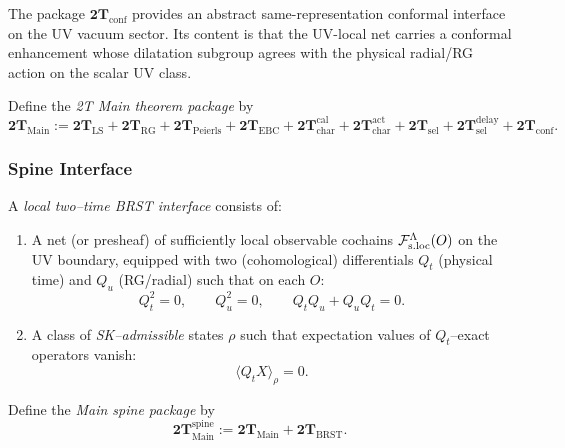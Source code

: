 \begin{remark}
\label{rem:2T-conf-source-role}
The package \(\mathbf{2T}_{\mathrm{conf}}\) provides an abstract
same-representation conformal interface on the UV vacuum sector. Its content is
that the UV-local
net carries a conformal enhancement whose dilatation subgroup agrees with the
physical radial/RG action on the scalar UV class.
\end{remark}

\begin{definition}
\label{def:2T-Main}
Define the \emph{2T Main theorem package} by
\[
\mathbf{2T}_{\mathrm{Main}}
:=
\mathbf{2T}_{\mathrm{LS}}
+ \mathbf{2T}_{\mathrm{RG}}
+ \mathbf{2T}_{\mathrm{Peierls}}
+ \mathbf{2T}_{\mathrm{EBC}}
+ \mathbf{2T}_{\mathrm{char}}^{\mathrm{cal}}
+ \mathbf{2T}_{\mathrm{char}}^{\mathrm{act}}
+ \mathbf{2T}_{\mathrm{sel}}
+ \mathbf{2T}_{\mathrm{sel}}^{\mathrm{delay}}
+ \mathbf{2T}_{\mathrm{conf}}.
\]
\end{definition}

\subsubsection{Spine Interface}

\begin{definition}
\label{def:2T-BRST}
A \emph{local two--time BRST interface} consists of:
\begin{enumerate}[label=\textbf{(B\arabic*)},leftmargin=*,itemsep=0.5em]
\item A net (or presheaf) of sufficiently local observable cochains
  $\mathcal F_{\mathrm{s.loc}}^\Lambda(O)$ on the UV boundary, equipped with two (cohomological) differentials
  $Q_t$ (physical time) and $Q_u$ (RG/radial) such that on each $O$:
  \[
  Q_t^2=0,\qquad Q_u^2=0,\qquad Q_t Q_u + Q_u Q_t = 0.
  \]
\item A class of \emph{SK--admissible} states $\rho$ such that expectation values
  of $Q_t$--exact operators vanish:
  \[
  \langle Q_t X\rangle_\rho =0.
  \]
\end{enumerate}
\end{definition}

\begin{definition}
\label{def:2T-Main-spine}
Define the \emph{Main spine package} by
\[
\mathbf{2T}_{\mathrm{Main}}^{\mathrm{spine}}
:= \mathbf{2T}_{\mathrm{Main}} + \mathbf{2T}_{\mathrm{BRST}}.
\]
\end{definition}

